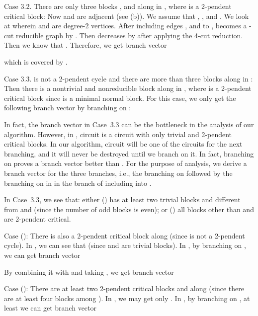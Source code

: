 \documentclass[runningheads]{llncs}
\begin{document}
Case 3.2. There are only three blocks ,  and  along  in  ,
where  is a 2-pendent critical block:
Now  and  are adjacent (see (b)). We assume that , , and .
We look at  wherein  and  are degree-2 vertices.
After including edges ,  and  to ,
 becomes a -cut reducible graph by .
Then  decreases by 
after applying the 4-cut reduction. Then we know that .
Therefore, we get branch vector

which is covered by .

Case 3.3.  is not a 2-pendent cycle and there are more than three blocks along  in  :
Then there is a nontrivial and nonreducible block  along  in  , where
  is a 2-pendent critical block since  is a minimal normal block.
For this case, we only get the following branch vector by branching on :

In fact, the branch vector  in Case~3.3 can be the bottleneck in the analysis of our algorithm.
However, in , circuit  is a circuit with only trivial and 2-pendent critical blocks.
In our algorithm, circuit  will be one of the circuits for the next branching,
and it will never be destroyed until we branch on it.
In fact,  branching on  proves a  branch vector better than .
For the purpose of analysis, we derive a branch vector for the three branches, i.e.,
 the branching on  followed by  the branching on
 in  in the branch of including   into .


In Case~3.3, we see that:  either
()  has at least two trivial blocks  and  different from  and  (since the number of odd blocks is even); or () all blocks other than  and   are 2-pendent critical.

Case (): There is also a 2-pendent critical block  along  (since  is not a 2-pendent cycle). In , we can see that  (since  and  are trivial blocks). In  , by branching on , we can get branch vector 

By combining it with  and taking , we get branch vector

Case (): There are at least two 2-pendent critical blocks  and  along  (since there are at least four blocks among ).
In , we may  get only .
In  , by branching on ,  at least we can get branch vector
\end{document}

